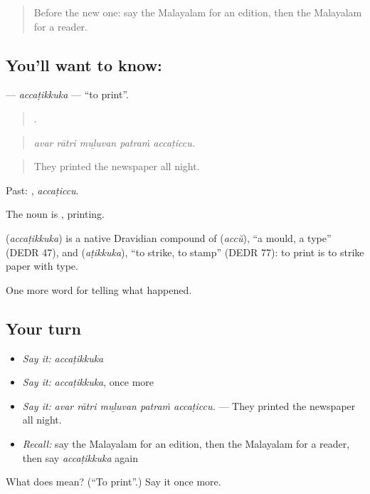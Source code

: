 \begin{quote}
Before the new one: say the Malayalam for an edition, then the Malayalam for a reader.
\end{quote}

\subsection*{You'll want to know: }
\textbf{} — \emph{accaṭikkuka} — \textquotedblleft{}to print\textquotedblright{}.

\begin{quote}
    .
\end{quote}

\begin{quote}
\emph{avar rātri muḻuvan patraṁ accaṭiccu.}
\end{quote}

\begin{quote}
They printed the newspaper all night.
\end{quote}

Past: , \emph{accaṭiccu}.

The noun is , printing.

\begin{cousinweb}
\textbf{} (\emph{accaṭikkuka}) is a native Dravidian compound of  (\emph{accŭ}), \textquotedblleft{}a mould, a type\textquotedblright{} (DEDR 47), and  (\emph{aṭikkuka}), \textquotedblleft{}to strike, to stamp\textquotedblright{} (DEDR 77): to print is to strike paper with type.
\end{cousinweb}

\begin{grammarlens}[title={What you've built}]
One more word for telling what happened.
\end{grammarlens}

\subsection*{Your turn}
\begin{itemize}
\raggedright
  \item \emph{Say it:} \emph{accaṭikkuka}
  \item \emph{Say it:} \emph{accaṭikkuka}, once more
  \item \emph{Say it:} \emph{avar rātri muḻuvan patraṁ accaṭiccu.} — They printed the newspaper all night.
  \item \emph{Recall:} say the Malayalam for an edition, then the Malayalam for a reader, then say \emph{accaṭikkuka} again
\end{itemize}

\begin{tcolorbox}[breakable,colback=teal!4,colframe=teal!35!black,title={Before you move on}]
What does  mean? (\textquotedblleft{}To print\textquotedblright{}.) Say it once more.
\end{tcolorbox}
